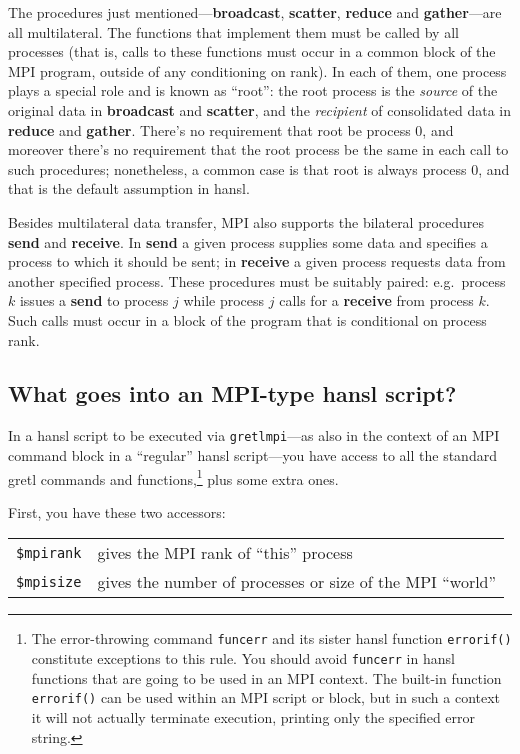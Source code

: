 \documentclass{article}
\begin{document}
The procedures just mentioned---\textbf{broadcast}, \textbf{scatter},
\textbf{reduce} and \textbf{gather}---are all multilateral. The
functions that implement them must be called by all processes (that
is, calls to these functions must occur in a common block of the MPI
program, outside of any conditioning on rank). In each of them, one
process plays a special role and is known as ``root'': the root
process is the \textit{source} of the original data in
\textbf{broadcast} and \textbf{scatter}, and the \textit{recipient} of
consolidated data in \textbf{reduce} and \textbf{gather}. There's no
requirement that root be process 0, and moreover there's no
requirement that the root process be the same in each call to such
procedures; nonetheless, a common case is that root is always process
0, and that is the default assumption in hansl.

Besides multilateral data transfer, MPI also supports the bilateral
procedures \textbf{send} and \textbf{receive}. In \textbf{send} a
given process supplies some data and specifies a process to which it
should be sent; in \textbf{receive} a given process requests data from
another specified process. These procedures must be suitably paired:
e.g.\ process $k$ issues a \textbf{send} to process $j$ while process
$j$ calls for a \textbf{receive} from process $k$. Such calls must
occur in a block of the program that is conditional on process rank.


\subsection{What goes into an MPI-type hansl script?}
\label{subsec:script}

In a hansl script to be executed via \texttt{gretlmpi}---as also
in the context of an MPI command block in a ``regular'' hansl
script---you have access to all the standard gretl commands and
functions,\footnote{The error-throwing command \texttt{funcerr} and
its sister hansl function \texttt{errorif()} constitute exceptions
to this rule. You should avoid \texttt{funcerr} in hansl functions
that are going to be used in an MPI context. The built-in function
\texttt{errorif()} can be used within an MPI script or block, but
in such a context it will not actually terminate execution, printing 
only the specified error string.} 
plus some extra ones.

First, you have these two accessors:
\begin{center}
\begin{tabular}{ll}
\texttt{\$mpirank} & gives the MPI rank of ``this'' process \\
\texttt{\$mpisize} & gives the number of processes or size of the MPI ``world''
\end{tabular}
\end{center}
\end{document}
